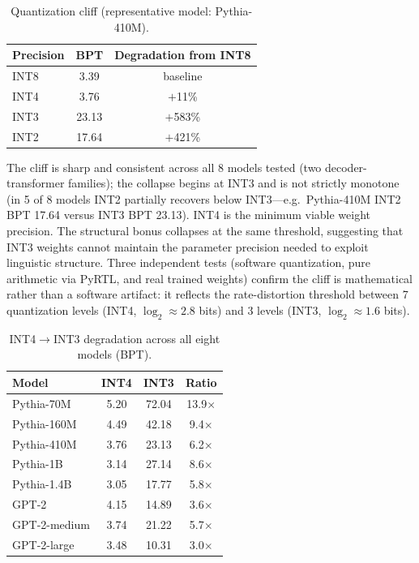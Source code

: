 \documentclass[11pt]{article}
\begin{document}
\begin{table}[ht]
\centering
\caption{Quantization cliff (representative model: Pythia-410M).}
\begin{tabular}{lcc}
\toprule
Precision & BPT & Degradation from INT8 \\
\midrule
INT8 & 3.39 & baseline \\
INT4 & 3.76 & $+$11\% \\
INT3 & 23.13 & $+$583\% \\
INT2 & 17.64 & $+$421\% \\
\bottomrule
\end{tabular}
\label{tab:quant}
\end{table}

The cliff is sharp and consistent across all 8 models tested (two decoder-transformer families); the collapse begins at INT3 and is not strictly monotone (in 5 of 8 models INT2 partially recovers below INT3---e.g.\ Pythia-410M INT2 BPT 17.64 versus INT3 BPT 23.13). INT4 is the minimum viable weight precision. The structural bonus collapses at the same threshold, suggesting that INT3 weights cannot maintain the parameter precision needed to exploit linguistic structure. Three independent tests (software quantization, pure arithmetic via PyRTL, and real trained weights) confirm the cliff is mathematical rather than a software artifact: it reflects the rate-distortion threshold between 7 quantization levels (INT4, $\log_2 \approx 2.8$ bits) and 3 levels (INT3, $\log_2 \approx 1.6$ bits).

\begin{table}[ht]
\centering
\caption{INT4$\to$INT3 degradation across all eight models (BPT).}
\label{tab:quant8}
\begin{tabular}{lccc}
\toprule
Model & INT4 & INT3 & Ratio \\
\midrule
Pythia-70M & 5.20 & 72.04 & 13.9$\times$ \\
Pythia-160M & 4.49 & 42.18 & 9.4$\times$ \\
Pythia-410M & 3.76 & 23.13 & 6.2$\times$ \\
Pythia-1B & 3.14 & 27.14 & 8.6$\times$ \\
Pythia-1.4B & 3.05 & 17.77 & 5.8$\times$ \\
GPT-2 & 4.15 & 14.89 & 3.6$\times$ \\
GPT-2-medium & 3.74 & 21.22 & 5.7$\times$ \\
GPT-2-large & 3.48 & 10.31 & 3.0$\times$ \\
\bottomrule
\end{tabular}
\end{table}
\end{document}

